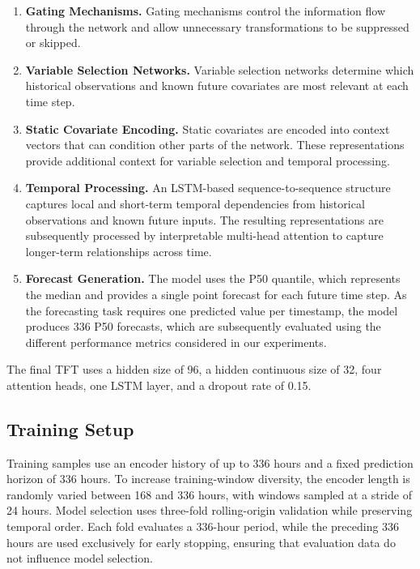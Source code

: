 \documentclass[11pt]{article}
\begin{document}
\begin{enumerate}
    \item \textbf{Gating Mechanisms.}
    Gating mechanisms control the information flow through the network and allow unnecessary transformations to be suppressed or skipped.

    \item \textbf{Variable Selection Networks.}
    Variable selection networks determine which historical observations and known future covariates are most relevant at each time step.

    \item \textbf{Static Covariate Encoding.}
    Static covariates are encoded into context vectors that can condition other parts of the network.
    These representations provide additional context for variable selection and temporal processing.

    \item \textbf{Temporal Processing.}
    An LSTM-based sequence-to-sequence structure captures local and short-term temporal dependencies from historical observations and known future inputs.
    The resulting representations are subsequently processed by interpretable multi-head attention to capture longer-term relationships across time.

    \item \textbf{Forecast Generation.}
    The model uses the P50 quantile, which represents the median and provides a single point forecast for each future time step.
    As the forecasting task requires one predicted value per timestamp, the model produces 336 P50 forecasts, which are subsequently evaluated using the different performance metrics considered in our experiments.
\end{enumerate}

\noindent The final TFT uses a hidden size of 96, a hidden continuous size of 32, four attention heads, one LSTM layer, and a dropout rate of 0.15.

\subsection{Training Setup}
Training samples use an encoder history of up to 336 hours and a fixed prediction horizon of 336 hours. To increase training-window diversity, the encoder length is randomly varied between 168 and 336 hours, with windows sampled at a stride of 24 hours. Model selection uses three-fold rolling-origin validation while preserving temporal order. Each fold evaluates a 336-hour period, while the preceding 336 hours are used exclusively for early stopping, ensuring that evaluation data do not influence model selection.
\newline
\end{document}
